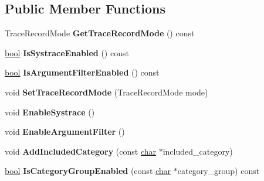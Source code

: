 \subsection*{Public Member Functions}
\begin{DoxyCompactItemize}
\item 
\mbox{\label{classv8_1_1platform_1_1tracing_1_1TraceConfig_a283a7b368c95196efeee809329329c3e}} 
Trace\+Record\+Mode {\bfseries Get\+Trace\+Record\+Mode} () const
\item 
\mbox{\label{classv8_1_1platform_1_1tracing_1_1TraceConfig_a3016e6ecb79bbd8be729d9184cb55295}} 
\mbox{\hyperlink{classbool}{bool}} {\bfseries Is\+Systrace\+Enabled} () const
\item 
\mbox{\label{classv8_1_1platform_1_1tracing_1_1TraceConfig_a39512c7461b02ab590aee35754899d3b}} 
\mbox{\hyperlink{classbool}{bool}} {\bfseries Is\+Argument\+Filter\+Enabled} () const
\item 
\mbox{\label{classv8_1_1platform_1_1tracing_1_1TraceConfig_ac6843c1347eb720bc3acf4ab82328539}} 
void {\bfseries Set\+Trace\+Record\+Mode} (Trace\+Record\+Mode mode)
\item 
\mbox{\label{classv8_1_1platform_1_1tracing_1_1TraceConfig_ae9291cd355351f989502518179adba23}} 
void {\bfseries Enable\+Systrace} ()
\item 
\mbox{\label{classv8_1_1platform_1_1tracing_1_1TraceConfig_a49ac9f0b03a9b546094af4f3493577bd}} 
void {\bfseries Enable\+Argument\+Filter} ()
\item 
\mbox{\label{classv8_1_1platform_1_1tracing_1_1TraceConfig_a5d5941e02cdfd629b71b043a684bd776}} 
void {\bfseries Add\+Included\+Category} (const \mbox{\hyperlink{classchar}{char}} $\ast$included\+\_\+category)
\item 
\mbox{\label{classv8_1_1platform_1_1tracing_1_1TraceConfig_a664f20d4cae11ce74ca8c087d74588cf}} 
\mbox{\hyperlink{classbool}{bool}} {\bfseries Is\+Category\+Group\+Enabled} (const \mbox{\hyperlink{classchar}{char}} $\ast$category\+\_\+group) const
\end{DoxyCompactItemize}
